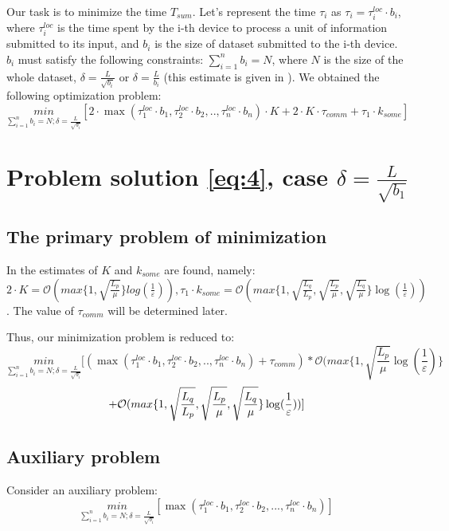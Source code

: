\documentclass{article}
\begin{document}
Our task is to minimize the time $T_{sum}$. Let's represent the time $\tau_i$ as $\tau_i = \tau_i^{loc}\cdot b_i$, where $\tau_i^{loc}$ is the time spent by the i-th device to process a unit of information submitted to its input, and $b_i$ is the size of dataset submitted to the i-th device. $b_i$ must satisfy the following constraints: $\sum\limits_{i = 1}^{n} b_i = N$, where $N$ is the size of the whole dataset, $\delta = \frac{L}{\sqrt{b_i}}$ or $\delta = \frac{L}{b_i}$ (this estimate is given in \cite{kovalev2022optimal}).
We obtained the following optimization problem:
\begin{equation}
    \label{eq:4}
    \underset{\sum\limits_{i = 1}^{n} b_i = N; \delta = \frac{L}{\sqrt{b_i}}}{min}[ 2\cdot\max(\tau_1^{loc}\cdot b_1, \tau_2^{loc}\cdot b_2, . ., \tau_n^{loc}\cdot b_n)\cdot K + 2\cdot K\cdot\tau_{comm} + \tau_1\cdot k_{some}]
\end{equation}
\section{Problem solution \ref{eq:4}, case $\delta = \frac{L}{\sqrt{b_1}}$}

\subsection{The primary problem of minimization}
In \cite{kovalev2022optimal} the estimates of $K$ and $k_{some}$ are found, namely: \\ $2\cdot K = \mathcal O(max\{1, \sqrt{\frac{L_p}{\mu}}\}log(\frac{1}{\varepsilon})), \tau_1\cdot k_{some} = \mathcal O(max\{1, \sqrt{\frac{L_q}{L_p}}, \sqrt{\frac{L_p}{\mu}}, \sqrt{\frac{L_q}{\mu}}\}\log(\frac{1}{\varepsilon}))$. The value of $\tau_{comm}$ will be determined later. 

Thus, our minimization problem is reduced to:
\begin{equation}
    \label{eq:5}
    \underset{\sum\limits_{i = 1}^{n} b_i = N; \delta = \frac{L}{\sqrt{b_i}}}{min}[(\max(\tau_1^{loc}\cdot b_1, \tau_2^{loc}\cdot b_2, . ., \tau_n^{loc}\cdot b_n) + \tau_{comm}) * \mathcal O(max\{1, \sqrt{\frac{L_p}{\mu}}\log(\frac{1}{\varepsilon})\} 
\end{equation}
\begin{equation}
     \notag
     +
    \mathcal O(max\{1,\sqrt{\frac{L_q}{L_p}}, \sqrt{\frac{L_p}{\mu}}, \sqrt{\frac{L_q}{\mu}}\}\log(\frac{1}{\varepsilon}))]  
\end{equation}

\subsection{Auxiliary problem}
Consider an auxiliary problem:
\begin{equation}
    \label{eq:6}
    \underset{\sum\limits_{i = 1}^{n} b_i = N; \delta = \frac{L}{\sqrt{b_i}}}{min} [\max(\tau_1^{loc}\cdot b_1, \tau_2^{loc}\cdot b_2, ..., \tau_n^{loc}\cdot b_n)]
\end{equation}
\end{document}
